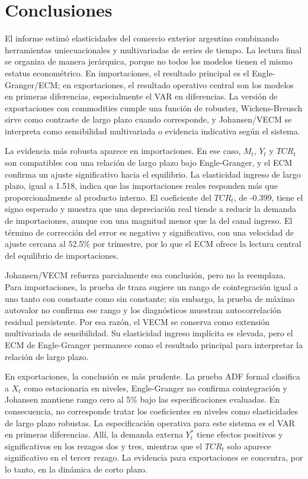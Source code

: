 \documentclass[11pt,a4paper]{article}
\begin{document}
	\section{Conclusiones}
	\label{sec:conclusiones}
	
	El informe estimó elasticidades del comercio exterior argentino combinando
	herramientas uniecuacionales y multivariadas de series de tiempo. La lectura
	final se organiza de manera jerárquica, porque no todos los modelos tienen el
	mismo estatus econométrico. En importaciones, el resultado principal es el
	Engle-Granger/ECM; en exportaciones, el resultado operativo central son los
	modelos en primeras diferencias, especialmente el VAR en diferencias. La
	versión de exportaciones con commodities cumple una función de robustez,
	Wickens-Breusch sirve como contraste de largo plazo cuando corresponde, y
	Johansen/VECM se interpreta como sensibilidad multivariada o evidencia
	indicativa según el sistema.
	
	La evidencia más robusta aparece en importaciones. En ese caso, \(M_t\),
	\(Y_t\) y \(TCR_t\) son compatibles con una relación de largo plazo bajo
	Engle-Granger, y el ECM confirma un ajuste significativo hacia el equilibrio.
	La elasticidad ingreso de largo plazo, igual a 1.518, indica que las
	importaciones reales responden más que proporcionalmente al producto interno.
	El coeficiente del \(TCR_t\), de -0.399, tiene el signo esperado y muestra que
	una depreciación real tiende a reducir la demanda de importaciones, aunque con
	una magnitud menor que la del canal ingreso. El término de corrección del error
	es negativo y significativo, con una velocidad de ajuste cercana al 52.5\% por
	trimestre, por lo que el ECM ofrece la lectura central del equilibrio de
	importaciones.
	
	Johansen/VECM refuerza parcialmente esa conclusión, pero no la reemplaza. Para
	importaciones, la prueba de traza sugiere un rango de cointegración igual a uno
	tanto con constante como sin constante; sin embargo, la prueba de máximo
	autovalor no confirma ese rango y los diagnósticos muestran autocorrelación
	residual persistente. Por esa razón, el VECM se conserva como extensión
	multivariada de sensibilidad. Su elasticidad ingreso implícita es elevada, pero
	el ECM de Engle-Granger permanece como el resultado principal para interpretar
	la relación de largo plazo.
	
	En exportaciones, la conclusión es más prudente. La prueba ADF formal clasifica
	a \(X_t\) como estacionaria en niveles, Engle-Granger no confirma cointegración
	y Johansen mantiene rango cero al 5\% bajo las especificaciones evaluadas. En
	consecuencia, no corresponde tratar los coeficientes en niveles como
	elasticidades de largo plazo robustas. La especificación operativa para este
	sistema es el VAR en primeras diferencias. Allí, la demanda externa \(Y_t^*\)
	tiene efectos positivos y significativos en los rezagos dos y tres, mientras
	que el \(TCR_t\) solo aparece significativo en el tercer rezago. La evidencia
	para exportaciones se concentra, por lo tanto, en la dinámica de corto plazo.
	
\end{document}
